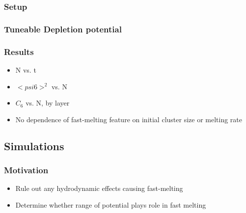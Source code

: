\documentclass[11pt]{article}
\begin{document}
\subsubsection{Setup}
\label{sec-2.2.1}

\subsubsection{Tuneable Depletion potential}
\label{sec-2.2.2}

\subsubsection{Results}
\label{sec-2.2.3}

\begin{itemize}

\item N vs. t\\
\label{sec-2.2.3.1}


\item $< psi6 >^2$ vs. N\\
\label{sec-2.2.3.2}


\item $C_6$ vs. N, by layer\\
\label{sec-2.2.3.3}


\item No dependence of fast-melting feature on initial cluster size or melting rate\\
\label{sec-2.2.3.4}

\end{itemize} %
\subsection{Simulations}
\label{sec-2.3}

\subsubsection{Motivation}
\label{sec-2.3.1}

\begin{itemize}

\item Rule out any hydrodynamic effects causing fast-melting\\
\label{sec-2.3.1.1}


\item Determine whether range of potential plays role in fast melting\\
\label{sec-2.3.1.2}

\end{itemize} %
\end{document}
